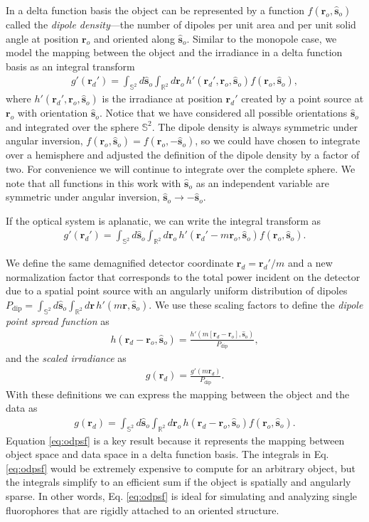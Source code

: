 \documentclass[]{osa-article}
\providecommand{\mb}[1]{\mathbf{#1}}
\providecommand{\ro}{\mathbf{\mathbf{r}}_o}
\providecommand{\so}{\mathbf{\hat{s}}_o}
\providecommand{\rd}{\mathbf{r}_d}
\providecommand{\mbb}[1]{\mathbb{#1}}
\begin{document}
In a delta function basis the object can be represented by a function
$f(\ro, \so)$ called the \textit{dipole density}---the number of dipoles per
unit area and per unit solid angle at position $\ro{}$ and oriented along
$\so{}$. Similar to the monopole case, we model the mapping between the object
and the irradiance in a delta function basis as an integral transform
\begin{align}
  g'(\rd') = \int_{\mbb{S}^2}d\so\int_{\mbb{R}^2}d\ro\, h'(\rd', \ro, \so)f(\ro, \so),
\end{align}
where $h'(\rd', \ro, \so)$ is the irradiance at position $\rd'$ created by a
point source at $\ro$ with orientation $\so$. Notice that we have considered all
possible orientations $\so$ and integrated over the sphere $\mbb{S}^2$. The
dipole density is always symmetric under angular inversion,
$f(\ro, \so) = f(\ro,-\so)$, so we could have chosen to integrate over a
hemisphere and adjusted the definition of the dipole density by a factor of two.
For convenience we will continue to integrate over the complete sphere. We note
that all functions in this work with $\so$ as an independent variable are
symmetric under angular inversion, $\so \rightarrow -\so$.

If the optical system is aplanatic, we can write the
integral transform as
\begin{align}
  g'(\rd') = \int_{\mbb{S}^2}d\so\int_{\mbb{R}^2}d\ro\, h'(\rd' - m\ro, \so)f(\ro, \so). 
\end{align}

We define the same demagnified detector coordinate $\rd = \rd'/m$ and a new
normalization factor that corresponds to the total power incident on the
detector due to a spatial point source with an angularly uniform distribution of
dipoles
$P_\text{dip} = \int_{\mbb{S}^2}d\so\int_{\mbb{R}^2}d\mb{r}\, h'(m\mb{r},
\so)$. We use these scaling factors to define the
\textit{dipole point spread function} as
\begin{align}
  h(\rd - \ro, \so) = \frac{h'(m[\rd - \ro], \so)}{P_\text{dip}}, 
\end{align}
and the \textit{scaled irradiance} as 
\begin{align}
  g(\rd) = \frac{g'(m\rd)}{P_\text{dip}}. 
\end{align}
With these definitions we can express the mapping between the object and the
data as
\begin{align}
g(\rd{}) = \int_{\mbb{S}^2}d\so{}\int_{\mbb{R}^2}d\ro{}\, h(\rd{} -\ro{}, \so{})f(\ro, \so). \label{eq:odpsf}
\end{align}
Equation \eqref{eq:odpsf} is a key result because it represents the mapping
between object space and data space in a delta function basis. The integrals in
Eq. \eqref{eq:odpsf} would be extremely expensive to compute for an arbitrary
object, but the integrals simplify to an efficient sum if the object is
spatially and angularly sparse. In other words, Eq. \eqref{eq:odpsf} is ideal for
simulating and analyzing single fluorophores that are rigidly attached to an
oriented structure.
\end{document}

